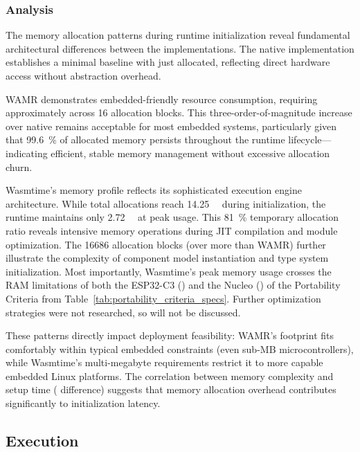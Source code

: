 \subsubsection{Analysis}

The memory allocation patterns during runtime initialization reveal fundamental architectural differences between the implementations. The native implementation establishes a minimal baseline with just  allocated, reflecting direct hardware access without abstraction overhead.

WAMR demonstrates embedded-friendly resource consumption, requiring approximately  across 16 allocation blocks. This three-order-of-magnitude increase over native remains acceptable for most embedded systems, particularly given that \SI[round-precision=1]{99.6}{\percent} of allocated memory persists throughout the runtime lifecycle—indicating efficient, stable memory management without excessive allocation churn.

Wasmtime's memory profile reflects its sophisticated execution engine architecture. While total allocations reach \SI{14.25}{\mega\byte} during initialization, the runtime maintains only \SI{2.72}{\mega\byte} at peak usage. This \SI[round-precision=1]{81}{\percent} temporary allocation ratio reveals intensive memory operations during JIT compilation and module optimization. The \num[round-precision=0]{16686} allocation blocks (over  more than WAMR) further illustrate the complexity of component model instantiation and type system initialization. Most importantly, Wasmtime's peak memory usage crosses the RAM limitations of both the ESP32-C3 () and the Nucleo () of the Portability Criteria from Table~\ref{tab:portability_criteria_specs}. Further optimization strategies were not researched, so will not be discussed.

These patterns directly impact deployment feasibility: WAMR's  footprint fits comfortably within typical embedded constraints (even sub-MB microcontrollers), while Wasmtime's multi-megabyte requirements restrict it to more capable embedded Linux platforms. The correlation between memory complexity and setup time ( difference) suggests that memory allocation overhead contributes significantly to initialization latency.

\subsection{Execution}


